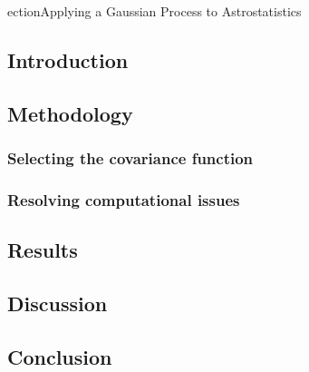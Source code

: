 ection{Applying a Gaussian Process to Astrostatistics}
% 
% 
% 
% 
% 
% 
% 
% 


\subsection{Introduction}



\subsection{Methodology}


\subsubsection{Selecting the covariance function}


\subsubsection{Resolving computational issues}


\subsection{Results}


\subsection{Discussion}


\subsection{Conclusion}

